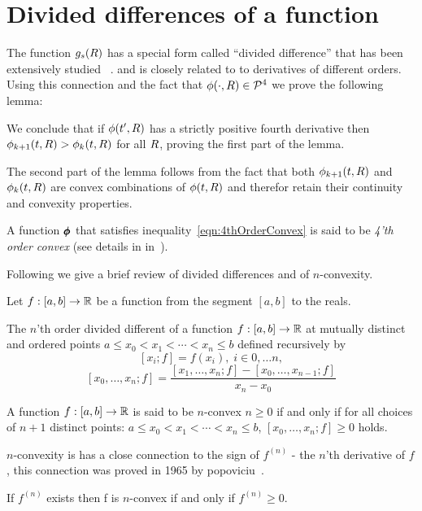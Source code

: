 \documentclass{article}[12pt]
\begin{document}
{\section{Divided differences of a function} \label{sec:divdiff}

The function $g_s(R)$ has a special form called ``divided difference''
that has been extensively studied ~\cite{popoviciu1965certaines,butt2016generalization, de2005divided}.
and is closely related to to derivatives of different orders. Using
this connection and the fact that $\phi(\cdot,R) \in {\cal P}^{4}$ we prove
the following lemma:


We conclude that if $\phi(t',R)$ has a strictly positive fourth
derivative then $\phi_{k+1}(t,R) > \phi_{k}(t,R)$ for all $R$, proving
the first part of the lemma.

The second part of the lemma follows from the fact that
both $\phi_{k+1}(t,R)$ and $\phi_{k}(t,R)$ are convex combinations of
$\phi(t,R)$ and therefor retain their continuity and convexity properties.

A function $\pmb{\phi}_{}$ that satisfies
inequality~\ref{eqn:4thOrderConvex} is said to be {\em 4'th order convex}
(see details in in~\cite{butt2016generalization}).


Following\cite{butt2016generalization} we give a brief review of
divided differences and of $n$-convexity.

Let $f:[a,b] \to \mathbb{R}$ be a function from the segment $[a,b]$ to the
reals.

\begin{definition}
  The $n$'th order divided different of a function $f:[a,b] \to
  \mathbb{R}$ at mutually distinct and ordered points $a \leq x_0 < x_1
  < \cdots < x_n \leq b$
  defined recursively by
  \[ [x_i; f] = f(x_i), \; i \in 0,\ldots n,\]
  \[ [x_0,\ldots,x_n;f] =
    \frac{[x_1,\ldots,x_n;f]-[x_0,\ldots,x_{n-1};f]}{x_n-x_0} \]
\end{definition}

\begin{definition}[$n$-convexity]
 A function $f:[a,b] \to \mathbb{R}$ is said to be $n$-convex  $n \geq 0$
 if and only if for all choices of $n+1$ distinct points: $a \leq x_0 < x_1
  < \cdots < x_n \leq b$, $[x_0,\ldots,x_n;f]\geq 0$ holds.
\end{definition}
$n$-convexity is has a close connection to the sign of $f^{(n)}$ - the $n$'th
derivative of $f$, this connection was proved in 1965 by
popoviciu~\cite{popoviciu1965certaines}.
\begin{theorem} \label{thm:popo}
If $f^{(n)}$ exists then f is $n$-convex if and only if $f^{(n)}\geq 0$.
\end{theorem}

}
\end{document}
